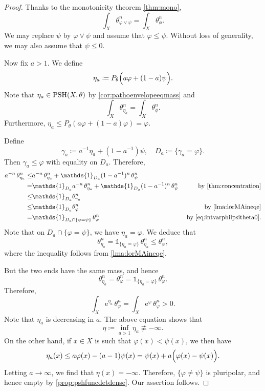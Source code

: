 \begin{proof}
    Thanks to the monotonicity theorem \cref{thm:mono},
    \[
    \int_X \theta_{\varphi\lor\psi}^n=\int_X \theta_{\phi}^n.
    \]
    We may replace $\psi$ by $\varphi\lor\psi$ and assume that $\varphi\leq \psi$. Without loss of generality, we may also assume that $\psi\leq 0$.

    Now fix $a>1$. We define
    \[
    \eta_a\coloneqq P_{\theta}\Bigl( a\varphi+(1-a)\psi\Bigr).
    \]
    Note that $\eta_a\in \mathrm{PSH}(X,\theta)$ by \cref{cor:pathoenvelopeeqmass} and
    \[
    \int_X \theta_{\eta_a}^n=\int_X \theta_{\phi}^n.
    \]
    Furthermore, $\eta_a\leq P_{\theta}(a\varphi+(1-a)\varphi)=\varphi$.

    Define
    \[
    \gamma_a\coloneqq a^{-1}\eta_a+(1-a^{-1})\psi,\quad D_a\coloneqq \{\gamma_a=\varphi\}.
    \]
    Then $\gamma_a\leq \varphi$ with equality on $D_a$. Therefore,
    \[
    \begin{aligned}
    a^{-n}\,\theta_{\eta_a}^n\leq & a^{-n}\,\theta_{\eta_a}^n+\mathds{1}_{D_a} (1-a^{-1})^n \,\theta_{\psi}^n&\\
    =& \mathds{1}_{D_a} a^{-n}\,\theta_{\eta_a}^n+\mathds{1}_{D_a} (1-a^{-1})^n \,\theta_{\psi}^n & \textup{ by \cref{thm:concentration}}\\
    \leq & \mathds{1}_{D_a} \theta_{\gamma_a}^n &\\
    \leq & \mathds{1}_{D_a} \theta_{\varphi}^n & \textup{ by \cref{lma:lorMAineqe}}\\
    =& \mathds{1}_{D_a\cap \{\varphi=\psi\}}\, \theta_{\varphi}^n & \textup{ by \eqref{eq:intvarphilpsitheta0}}.
    \end{aligned}
    \]
    Note that on $D_a\cap \{\varphi=\psi\}$, we have $\eta_a=\varphi$.
    We deduce that
    \[
    \theta_{\eta_a}^n=\mathds{1}_{\{\eta_a=\varphi\}}\, \theta_{\eta_a}^n \leq \theta_{\varphi}^n,
    \]
    where the inequality follows from \cref{lma:lorMAineqe}.

    But the two ends have the same mass, and hence
    \[
    \theta_{\eta_a}^n=\theta_{\varphi}^n=\mathds{1}_{\{\eta_a=\varphi\}}\,\theta_{\varphi}^n.
    \]
    Therefore,
    \[
    \int_X \mathrm{e}^{\eta_a}\,\theta_{\varphi}^n=\int_X \mathrm{e}^{\varphi}\,\theta_{\varphi}^n>0.
    \]
    Note that $\eta_a$ is decreasing in $a$. The above equation shows that
    \[
    \eta\coloneqq\inf_{a>1} \eta_a\not\equiv -\infty.
    \]
    On the other hand, if $x\in X$ is such that $\varphi(x)<\psi(x)$, we then have
    \[
    \eta_a(x)\leq a\varphi(x)-(a-1)\psi(x)= \psi(x)+a\Bigl( \varphi(x)-\psi(x) \Bigr).
    \]
    Letting $a\to \infty$, we find that $\eta(x)=-\infty$. Therefore, $\{\varphi\neq \psi\}$ is pluripolar, and hence empty by \cref{prop:pshfuncdetdense}. Our assertion follows.
\end{proof}



